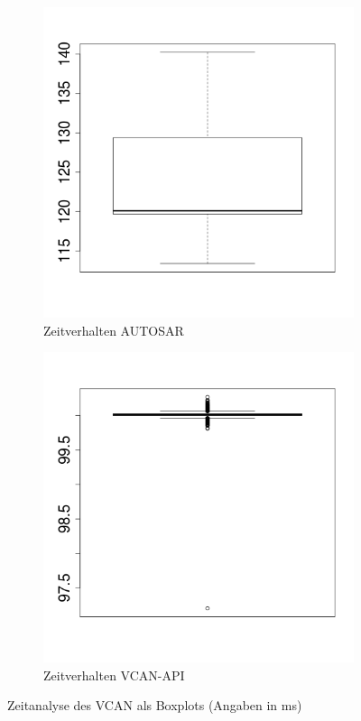 \documentclass[
  a4paper,					    %
  twoside,
  DIV=calc,     				%
  bibliography=totoc,
  cleardoublepage=empty,
  ngerman,     					%
  final       					%
]{scrbook}
\begin{document}
\begin{figure}
    \centering
    \begin{subfigure}[b]{0.49\textwidth}
        \centering
        \includegraphics[width=\textwidth]{boxplot_as}
        \caption{Zeitverhalten AUTOSAR}
        \label{fig:boxplot_as}
    \end{subfigure}
    \begin{subfigure}[b]{0.49\textwidth}
        \centering
        \includegraphics[width=\textwidth]{boxplot_vcan}
        \caption{Zeitverhalten VCAN-API}
        \label{fig:boxplot_vcan}
    \end{subfigure}
    \caption[Zeitanalyse des VCAN als Boxplots]{Zeitanalyse des VCAN als Boxplots (Angaben in ms)}
    \label{fig:timinganalyse}
\end{figure}
\end{document}
